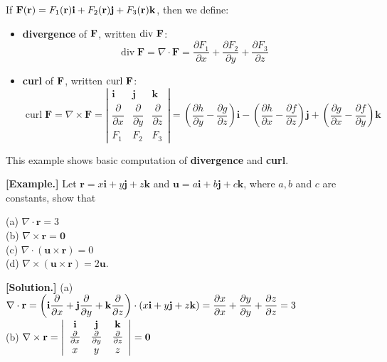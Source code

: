 \documentclass[11pt, a4paper]{MATH2023}
\newcommand{\eg}{\textbf{[Example.] }}
\newcommand{\sol}{\textbf{[Solution.] }}
\newcommand{\ii}{{\bf i}}
\newcommand{\jj}{{\bf j}}
\newcommand{\kk}{{\bf k}}
\newcommand{\rr}{{\bf r}}
\newcommand{\FF}{{\bf F}}
\renewcommand{\div}{{\rm div\ }}
\newcommand{\curl}{{\rm curl\ }}
\begin{document}
\begin{spacing}{1.3}
    If $\FF (\rr)=F_1(\rr)\ii +F_2(\rr) \jj +F_3(\rr) \kk$, then we define: 
    \begin{itemize}
        \item {\bf divergence} of $\FF$, written $\div \FF$:   
        $$\boxed{
        \operatorname{div} \mathbf{F}=\nabla \cdot \mathbf{F}=\frac{\partial F_1}{\partial x}+\frac{\partial F_2}{\partial y}+\frac{\partial F_3}{\partial z}
        }$$
        \item {\bf curl} of $\FF$, written $\curl \FF$: 
        $$\boxed{
        \operatorname{curl} \mathbf{F}=\nabla \times \mathbf{F}=\left|\begin{array}{ccc}
        \mathbf{i} & \mathbf{j} & \mathbf{k} \\
        \dfrac{\partial}{\partial x} & \dfrac{\partial}{\partial y} & \dfrac{\partial}{\partial z} \\
        F_1 & F_2 & F_3
        \end{array}\right|=\left(\frac{\partial h}{\partial y}-\frac{\partial g}{\partial z}\right) \mathbf{i}-\left(\frac{\partial h}{\partial x}-\frac{\partial f}{\partial z}\right) \mathbf{j}+\left(\frac{\partial g}{\partial x}-\frac{\partial f}{\partial y}\right) \mathbf{k}
        }$$
    \end{itemize}

    {\blue This example shows basic computation of {\bf divergence} and {\bf curl}.}

    \eg Let $\mathbf{r}=x \mathbf{i}+y \mathbf{j}+z \mathbf{k}$ and $\mathbf{u}=a \mathbf{i}+b \mathbf{j}+c \mathbf{k}$, where $a, b$ and $c$ are constants, show that

    (a) $\nabla \cdot \mathbf{r}=3$\\
    (b) $\nabla \times \mathbf{r}=\mathbf{0}$\\
    (c) $\nabla \cdot(\mathbf{u} \times \mathbf{r})=0$\\
    (d) $\nabla \times(\mathbf{u} \times \mathbf{r})=2 \mathbf{u}$.

    \sol 
    (a) $\displaystyle \nabla \cdot \mathbf{r}=\left(\mathbf{i} \frac{\partial}{\partial x}+\mathbf{j} \frac{\partial}{\partial y}+\mathbf{k} \frac{\partial}{\partial z}\right) \cdot(x \mathbf{i}+y \mathbf{j}+z \mathbf{k})=
    \frac{\partial x}{\partial x}+\frac{\partial y}{\partial y}+\frac{\partial z}{\partial z}=3$\\
    (b) $\displaystyle \nabla \times \mathbf{r}=\left|\begin{array}{ccc}
            \mathbf{i} & \mathbf{j} & \mathbf{k} \\ 
            \frac{\partial}{\partial x} & \frac{\partial}{\partial y} & \frac{\partial}{\partial z} \\ 
            x & y & z
        \end{array}\right|=\mathbf{0}$


\end{spacing}
\end{document}
